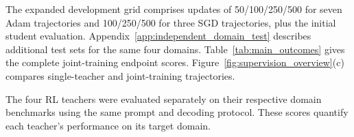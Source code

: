 The expanded development grid comprises updates of 50/100/250/500 for seven Adam trajectories and 100/250/500 for three SGD trajectories, plus the initial student evaluation. Appendix~\ref{app:independent_domain_test} describes additional test sets for the same four domains. Table~\ref{tab:main_outcomes} gives the complete joint-training endpoint scores. Figure~\ref{fig:supervision_overview}(c) compares single-teacher and joint-training trajectories.

The four RL teachers were evaluated separately on their respective domain benchmarks using the same prompt and decoding protocol. These scores quantify each teacher's performance on its target domain.

